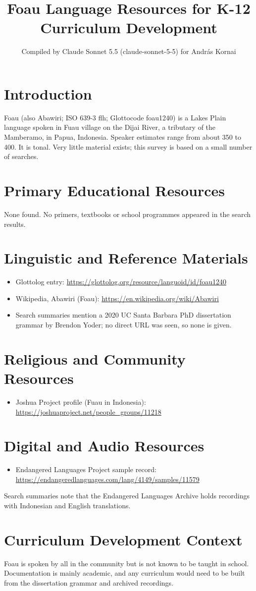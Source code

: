 \documentclass[12pt]{article}
\title{Foau Language Resources for K-12 Curriculum Development}
\author{Compiled by Claude Sonnet 5.5 (claude-sonnet-5-5) for Andr\'as Kornai}
\date{}
\begin{document}
\maketitle

\section{Introduction}
Foau (also Abawiri; ISO 639-3 flh; Glottocode foau1240) is a Lakes Plain language spoken in Fuau village on the Dijai River, a tributary of the Mamberamo, in Papua, Indonesia. Speaker estimates range from about 350 to 400. It is tonal. Very little material exists; this survey is based on a small number of searches.

\section{Primary Educational Resources}
None found. No primers, textbooks or school programmes appeared in the search results.

\section{Linguistic and Reference Materials}
\begin{itemize}
\item Glottolog entry: \url{https://glottolog.org/resource/languoid/id/foau1240}
\item Wikipedia, Abawiri (Foau): \url{https://en.wikipedia.org/wiki/Abawiri}
\item Search summaries mention a 2020 UC Santa Barbara PhD dissertation grammar by Brendon Yoder; no direct URL was seen, so none is given.
\end{itemize}

\section{Religious and Community Resources}
\begin{itemize}
\item Joshua Project profile (Fuau in Indonesia): \url{https://joshuaproject.net/people_groups/11218}
\end{itemize}

\section{Digital and Audio Resources}
\begin{itemize}
\item Endangered Languages Project sample record: \url{https://endangeredlanguages.com/lang/4149/samples/11579}
\end{itemize}
Search summaries note that the Endangered Languages Archive holds recordings with Indonesian and English translations.

\section{Curriculum Development Context}
Foau is spoken by all in the community but is not known to be taught in school. Documentation is mainly academic, and any curriculum would need to be built from the dissertation grammar and archived recordings.
\end{document}
